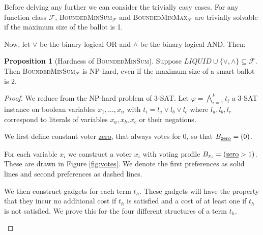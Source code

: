 \documentclass[11pt,a4paper, titlepage]{article}
\theoremstyle{definition}
\newtheorem{proposition}[theorem]{Proposition}
\begin{document}
Before delving any further we can consider the trivially easy cases. 
For any function class $\mathcal{F}$, \textsc{BoundedMinSum}$_\mathcal{F}$ and \textsc{BoundedMinMax}$_\mathcal{F}$ are trivially solvable if the maximum size of the ballot is 1.

Now, let $\lor$ be the binary logical OR and $\land$ be the binary logical AND. Then:

\begin{proposition}[Hardness of \textsc{BoundedMinSum}]
    Suppose $\mathit{LIQUID} \cup \{\lor, \land\} \subseteq \mathcal{F}$. Then \textsc{BoundedMinSum}$_\mathcal{F}$ is NP-hard, even if the maximum size of a smart ballot is 2.    
\end{proposition}

\begin{proof}
    We reduce from the NP-hard problem of \textsc{3-SAT}.
    Let $\varphi = \bigwedge_{i = 1}^k t_i $ a \textsc{3-SAT} instance on boolean variables $x_1, \ldots, x_n$ with $t_i = l_a \lor l_b \lor l_c $ where $l_a, l_b, l_c$ correspond to literals of variables $x_a, x_b, x_c$ or their negations.
    
    We first define constant voter \underline{zero}, that always votes for 0, so that $B_{\text{\underline{zero}}} = (0)$.



For each variable $x_i$ we construct a voter $x_i$ with voting profile $B_{x_i} = (  \text{\underline{zero}} > 1) $. These are drawn in Figure \ref{fig:votes}. We denote the first preferences as solid lines and second preferences as dashed lines.


We then construct gadgets for each term $t_h$. 
These gadgets will have the property that they incur no additional cost if $t_h$ is satisfied and a cost of at least one if $t_h$ is not satisfied. We prove this for the four different structures of a term $t_h$.

\begin{figure}
    \centering
    \qquad
    \subfloat[Voter $x_i$]{
        \begin{tikzpicture}[edge from parent/.style={draw,-latex}, align=center,node distance=2cm]


\end{tikzpicture}}
\end{figure}
\end{proof}
\end{document}
